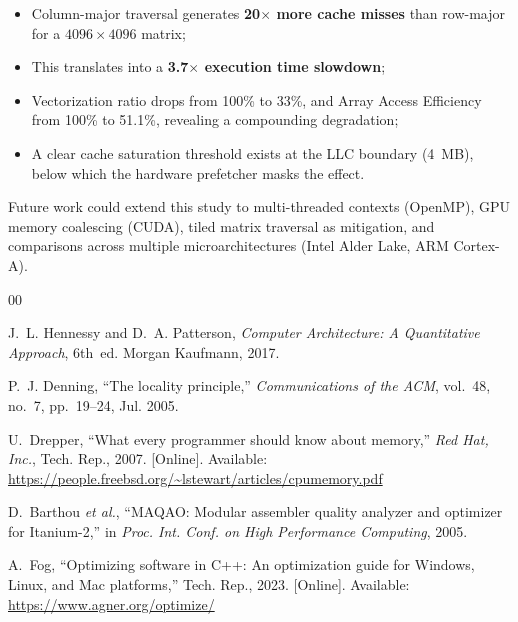 \documentclass[conference]{IEEEtran}
\begin{document}
\begin{itemize}
  \item Column-major traversal generates \textbf{20$\times$ more cache misses}
        than row-major for a $4096 \times 4096$ matrix;
  \item This translates into a \textbf{3.7$\times$ execution time slowdown};
  \item Vectorization ratio drops from 100\% to 33\%, and Array Access
        Efficiency from 100\% to 51.1\%, revealing a compounding degradation;
  \item A clear cache saturation threshold exists at the LLC boundary (4~MB),
        below which the hardware prefetcher masks the effect.
\end{itemize}

Future work could extend this study to multi-threaded contexts (OpenMP), GPU
memory coalescing (CUDA), tiled matrix traversal as mitigation, and comparisons
across multiple microarchitectures (Intel Alder Lake, ARM Cortex-A).

\begin{thebibliography}{00}

J.~L. Hennessy and D.~A. Patterson,
\textit{Computer Architecture: A Quantitative Approach}, 6th~ed.
Morgan Kaufmann, 2017.

P.~J. Denning,
``The locality principle,''
\textit{Communications of the ACM}, vol.~48, no.~7, pp.~19--24, Jul. 2005.

U.~Drepper,
``What every programmer should know about memory,''
\textit{Red Hat, Inc.}, Tech. Rep., 2007. [Online]. Available:
\url{https://people.freebsd.org/~lstewart/articles/cpumemory.pdf}

D.~Barthou \textit{et al.},
``MAQAO: Modular assembler quality analyzer and optimizer for Itanium-2,''
in \textit{Proc. Int. Conf. on High Performance Computing}, 2005.

A.~Fog,
``Optimizing software in C++: An optimization guide for Windows, Linux,
and Mac platforms,'' Tech. Rep., 2023. [Online]. Available:
\url{https://www.agner.org/optimize/}

\end{thebibliography}
\end{document}
